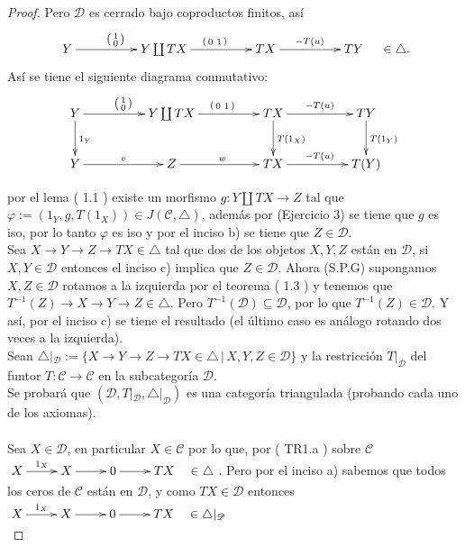 \documentclass{article}
\newcommand{\spmat}[1]{%
  \left(\begin{smallmatrix}#1\end{smallmatrix}\right)%
}
\begin{document}
\begin{enumerate}
\begin{proof}
Pero $\mathscr{D}$ es cerrado bajo coproductos finitos, así 
\begin{equation*}
\xymatrix@C+2pc{Y\ar[r]^{\spmat{1 \\ 0}} & Y\coprod TX\ar[r]^{\spmat{ 0 & 1}} & TX\ar[r]^{-T(u)} & TY}\quad \in \triangle .
\end{equation*}
Así se tiene el siguiente diagrama conmutativo:\\


\begin{equation*}
\xymatrix@C+2pc{Y\ar[r]^{\spmat{1 \\ 0}}\ar[d]^{1_Y} & Y\coprod TX\ar[r]^{\spmat{ 0 & 1}} & TX\ar[d]^{T(1_X)}\ar[r]^{-T(u)} 
& TY\ar[d]^{T(1_Y)}\\
Y\ar[r]^v & Z\ar[r]^w & TX\ar[r]^{-T(u)} & T(Y)}
\end{equation*}

por el lema ( 1.1 ) existe un morfismo $g:Y\coprod TX\longrightarrow Z$ tal que \\$\varphi:=(1_Y,g,T(1_X))\in J(\mathscr{C},\triangle)$, además por
 (Ejercicio 3) se tiene que $g$ es iso, por lo tanto $\varphi$ es iso y por el inciso b) se tiene que $Z\in \mathscr{D}$.\\

 Sea $X\to Y\to Z\to TX \in \triangle$ tal que dos de los objetos $X,Y,Z$ están en $\mathscr{D}$, si $X,Y\in \mathscr{D}$ entonces el 
inciso c) implica que $Z\in \mathscr{D}$. Ahora (S.P.G) supongamos $X,Z\in \mathscr{D}$ rotamos a la izquierda por el teorema ( 1.3 ) y tenemos 
que $T^{-1}(Z)\to X\to Y\to Z\in \triangle$. Pero $T^{-1}(\mathscr{D})\subseteq \mathscr{D}$, por lo que $T^{-1}(Z)\in \mathscr{D}$. 
Y así, por el inciso c) se tiene el resultado (el último caso es análogo rotando dos veces a la izquierda).\\

 Sean $\triangle|_{\mathscr{D}}:=\{X\to Y\to Z\to TX\in \triangle\,|\, X,Y,Z\in \mathscr{D}\}$ y la restricción $T|_{\mathscr{D}}$ del
funtor $T:\mathscr{C}\longrightarrow \mathscr{C}$ en la subcategoría $\mathscr{D}$.\\

Se probará que $(\mathscr{D},T|_{\mathscr{D}},\triangle|_{\mathscr{D}})$ es una categoría triangulada (probando cada uno de los axiomas).\\

\\
Sea $X\in \mathscr{D}$, en particular  $X\in \mathscr{C}$ por lo que, por ( TR1.a ) sobre $\mathscr{C}$
\\$\xymatrix{X\ar[r]^{1_X}&X\ar[r]&0\ar[r]&TX\quad\in \triangle}$.
Pero por el inciso a) sabemos que todos los ceros de $\mathscr{C}$ están en $\mathscr{D}$, y como $TX\in \mathscr{D}$  entonces \\
$\xymatrix{X\ar[r]^{1_X}&X\ar[r]&0\ar[r]&TX\quad\in \triangle|_{\mathscr{D}}}$\\


\end{proof}
\end{enumerate}
\end{document}
